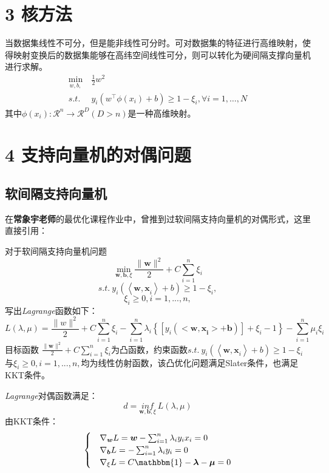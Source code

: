 \documentclass[twoside]{article}
\begin{document}
\section*{3 核方法}
当数据集线性不可分，但是能非线性可分时。可对数据集的特征进行高维映射，使得映射变换后的数据集能够在高纬空间线性可分，则可以转化为硬间隔支撑向量机进行求解。
\begin{equation*}
    \begin{aligned}
        \underset{w,b,}{\min}\ &\frac{1}{2} w^2\\
    s.t.\  &y_i(w^\top \phi(x_i)+b) \ge 1-\xi_i,\forall i=1,\dots,N
    \end{aligned}
\end{equation*}
其中$\phi(x_i):\mathcal{R}^n \longrightarrow \mathcal{R}^D(D>n)$是一种高维映射。
\section*{4 支持向量机的对偶问题}
\subsection*{软间隔支持向量机}
在\textbf{常象宇老师}的最优化课程作业中，曾推到过软间隔支持向量机的对偶形式，这里直接引用：

对于软间隔支持向量机问题
$$
\underset{\boldsymbol{w,b,}\xi}{\min}\frac{\lVert \boldsymbol{w} \rVert ^2}{2}+C\sum_{i=1}^n{\xi _i}
$$
$$
s.t.\ y_i\left( \left< \left. \boldsymbol{w,x}_i \right> +b \right. \right) \geq 1-\xi _i ,
$$
$$
\xi _i\geq 0,i=1,...,n,
$$
写出\textit{Lagrange}函数如下：
\begin{equation}
    L(\lambda,\mu)=
\frac{\lVert w \rVert ^2}{2}+C\sum_{i=1}^n{\xi _i-\sum_{i=1}^n{\lambda _i\left\{ \left[ y_i\left( <\boldsymbol{w,x}_{\boldsymbol{i}}>+\boldsymbol{b} \right) \right] +\xi _i-1 \right\} -\sum_{i=1}^n{\mu _i\xi _i}}}
\end{equation}
目标函数
$
\frac{\lVert \boldsymbol{w} \rVert ^2}{2}+C\sum_{i=1}^n{\xi _i}
$为凸函数，约束函数$
s.t.\ y_i\left( \left< \left. \boldsymbol{w,x}_i \right> +b \right. \right) \geq 1-\xi _i$与$
\xi _i\geq 0,i=1,...,n,
$均为线性仿射函数，该凸优化问题满足Slater条件，也满足KKT条件。

\textit{Lagrange}对偶函数满足：
\begin{equation}
    d=\underset{\boldsymbol{w},\boldsymbol{b},\xi}{inf}\ L(\lambda,\mu) \label{lagdual}
\end{equation}
由KKT条件：
\begin{equation*}
    \begin{cases}
    &\nabla_{\boldsymbol{w}} L=\boldsymbol{w}-\sum_{i=1}^{n} \lambda_i y_i x_i=0\\
    &\nabla_{\boldsymbol{b}} L= -\sum_{i=1}^{n} \lambda_i y_i=0\\
    &\nabla_{\xi} L= C \mathbbm{1}- \boldsymbol{\lambda} -\boldsymbol{\mu}=0    
\end{cases}
\end{equation*}
\end{document}
